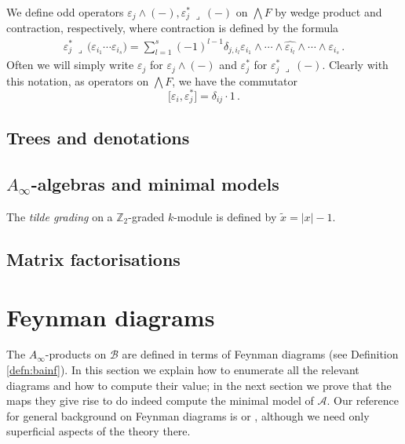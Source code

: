 \documentclass[english,letter paper,12pt,leqno]{article}
\theoremstyle{example}
\numberwithin{equation}{section}
\def\be{\begin{equation}}
\def\ee{\end{equation}}
\def\nZ{\mathds{Z}}
\begin{document}
We define odd operators $\varepsilon_j \wedge (-), \varepsilon_j^* \,\lrcorner\, (-)$ on $\bigwedge F$ by wedge product and contraction, respectively, where contraction is defined by the formula
\begin{align*}
\varepsilon_j^* \,\lrcorner\, \Big( \varepsilon_{i_1} \cdots \varepsilon_{i_s} \Big) = \sum_{l=1}^s (-1)^{l-1} \delta_{j, i_l} \varepsilon_{i_1} \wedge \cdots \wedge \widehat{ \varepsilon_{i_l} } \wedge \cdots \wedge \varepsilon_{i_s}\,.
\end{align*}
Often we will simply write $\varepsilon_j$ for $\varepsilon_j \wedge (-)$ and $\varepsilon_j^*$ for $\varepsilon_j^* \,\lrcorner\, (-)$. Clearly with this notation, as operators on $\bigwedge F$, we have the commutator
\be\label{eq:wedge_contract_comm}
\big[ \varepsilon_i, \varepsilon_j^* \big] = \delta_{ij} \cdot 1\,.
\ee

\subsection{Trees and denotations}

\subsection{$A_\infty$-algebras and minimal models}

The \emph{tilde grading} on a $\nZ_2$-graded $k$-module is defined by $\widetilde{x} = |x| - 1$. 

\subsection{Matrix factorisations}

\section{Feynman diagrams}

The $A_\infty$-products on $\mathscr{B}$ are defined in terms of Feynman diagrams (see Definition \ref{defn:bainf}). In this section we explain how to enumerate all the relevant diagrams and how to compute their value; in the next section we prove that the maps they give rise to do indeed compute the minimal model of $\mathscr{A}$. Our reference for general background on Feynman diagrams is \cite[Ch. 6]{weinberg} or \cite[\S 4.4]{ps}, although we need only superficial aspects of the theory there.
\end{document}

